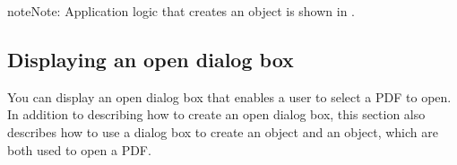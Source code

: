 \documentclass[letterpaper,12pt,english,openany,oneside]{sphinxmanual}
\begin{document}
\begin{sphinxadmonition}{note}{Note:}
Application logic that creates an  object is shown in .
\end{sphinxadmonition}


\subsection{Displaying an open dialog box}
\label{\detokenize{Plugins_Documents:displaying-an-open-dialog-box}}
You can display an open dialog box that enables a user to select a PDF to open. In addition to describing how to create an open dialog box, this section also describes how to use a dialog box to create an  object and an  object, which are both used to open a PDF.
\end{document}
